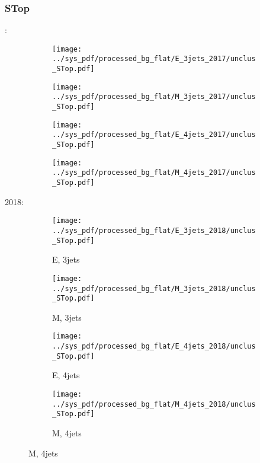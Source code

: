 \documentclass{beamer}
\begin{document}
\begin{frame}
\frametitle{STop}
\fontsize{5}{1}:
\begin{figure}
\centering
\begin{subfigure}[b]{0.24\textwidth}
\texttt{[image: ../sys\_pdf/processed\_bg\_flat/E\_3jets\_2017/unclus\_STop.pdf]}
\end{subfigure}
\begin{subfigure}[b]{0.24\textwidth}
\texttt{[image: ../sys\_pdf/processed\_bg\_flat/M\_3jets\_2017/unclus\_STop.pdf]}
\end{subfigure}
\begin{subfigure}[b]{0.24\textwidth}
\texttt{[image: ../sys\_pdf/processed\_bg\_flat/E\_4jets\_2017/unclus\_STop.pdf]}
\end{subfigure}
\begin{subfigure}[b]{0.24\textwidth}
\texttt{[image: ../sys\_pdf/processed\_bg\_flat/M\_4jets\_2017/unclus\_STop.pdf]}
\end{subfigure}
\end{figure}
2018:
\begin{figure}
\centering
\begin{subfigure}[b]{0.24\textwidth}
\texttt{[image: ../sys\_pdf/processed\_bg\_flat/E\_3jets\_2018/unclus\_STop.pdf]}
\captionsetup{font=tiny}
\caption{E, 3jets}
\end{subfigure}
\begin{subfigure}[b]{0.24\textwidth}
\texttt{[image: ../sys\_pdf/processed\_bg\_flat/M\_3jets\_2018/unclus\_STop.pdf]}
\captionsetup{font=tiny}
\caption{M, 3jets}
\end{subfigure}
\begin{subfigure}[b]{0.24\textwidth}
\texttt{[image: ../sys\_pdf/processed\_bg\_flat/E\_4jets\_2018/unclus\_STop.pdf]}
\captionsetup{font=tiny}
\caption{E, 4jets}
\end{subfigure}
\begin{subfigure}[b]{0.24\textwidth}
\texttt{[image: ../sys\_pdf/processed\_bg\_flat/M\_4jets\_2018/unclus\_STop.pdf]}
\captionsetup{font=tiny}
\caption{M, 4jets}
\end{subfigure}
\end{figure}
\end{frame}
\end{document}
